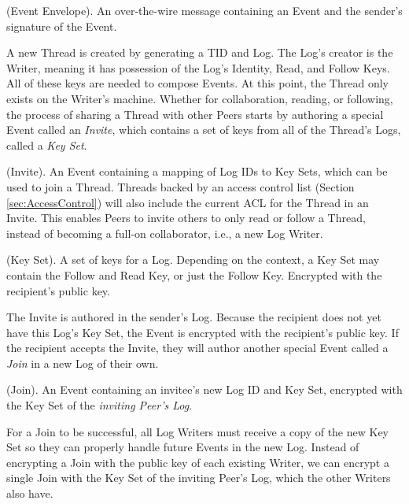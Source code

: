 \documentclass{textile}
\begin{document}
\begin{definition}
(Event Envelope). An over-the-wire message containing an Event and the sender's signature of the Event.
\end{definition}

A new Thread is created by generating a TID and Log. The Log's creator is the Writer, meaning it has possession of the Log's Identity, Read, and Follow Keys. All of these keys are needed to compose Events. At this point, the Thread only exists on the Writer's machine. Whether for collaboration, reading, or following, the process of sharing a Thread with other Peers starts by authoring a special Event called an \emph{Invite}, which contains a set of keys from all of the Thread's Logs, called a \emph{Key Set}.

\begin{definition}
(Invite). An Event containing a mapping of Log IDs to Key Sets, which can be used to join a Thread. Threads backed by an access control list (Section  \ref{sec:AccessControl}) will also include the current ACL for the Thread in an Invite. This enables Peers to invite others to only read or follow a Thread, instead of becoming a full-on collaborator, i.e., a new Log Writer.
\end{definition}

\begin{definition}
(Key Set). A set of keys for a Log. Depending on the context, a Key Set may contain the Follow and Read Key, or just the Follow Key. Encrypted with the recipient's public key.
\end{definition}

The Invite is authored in the sender's Log. Because the recipient does not yet have this Log's Key Set, the Event is encrypted with the recipient's public key. If the recipient accepts the Invite, they will author another special Event called a \emph{Join} in a new Log of their own.

\begin{definition}
(Join). An Event containing an invitee's new Log ID and Key Set, encrypted with the Key Set of the \emph{inviting Peer's Log}.
\end{definition}

For a Join to be successful, all Log Writers must receive a copy of the new Key Set so they can properly handle future Events in the new Log. Instead of encrypting a Join with the public key of each existing Writer, we can encrypt a single Join with the Key Set of the inviting Peer's Log, which the other Writers also have.
\end{document}
